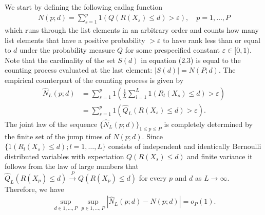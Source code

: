 \documentclass[oupdraft]{bio}
\newcommand{\nn}{\nonumber}
\begin{document}
We start by defining the following cadlag function
\begin{align}
  N(p; d) = \sum_{s=1}^p 1\left(Q(R(X_s) \leq d) > \varepsilon\right), \quad p = 1,\ldots, P
\end{align}
which runs through the list elements in an arbitrary order and counts
how many list elements that have a positive probability $>\varepsilon$ to have
rank less than or equal to $d$ under the probability measure $Q$ for some prespecified constant $\varepsilon\in[0, 1)$.
Note that the cardinality of the set $S(d)$ in equation
(2.3) is equal to the counting process evaluated at the last element: $|S(d)| = N(P;d)$.
The empirical counterpart of the counting process is given by
\begin{align}
  \widehat{N}_L(p; d) &= \sum_{s=1}^p 1\left( \frac{1}{L} \sum_{l=1}^L 1(R_l(X_s) \leq d) > \varepsilon\right)\\
        &= \sum_{s=1}^p 1\left(\widehat{Q}_L(R(X_s) \leq d) > \varepsilon\right)\nn.
\end{align}
The joint law of the sequence
$\{\widehat{N}_L(p;d)\}_{1\leq p \leq P}$ is completely determined by
the finite set of the jump times of $N(p;d)$. Since
$\{1(R_l(X_s) \leq d); l=1,\dots, L\}$ consists of independent and
identically Bernoulli distributed variables with expectation
$Q(R(X_s) \leq d)$ and finite variance it follows from the law of large numbers that
$\widehat{Q}_L(R(X_p) \leq d) \overset{P}{\longrightarrow} Q(R(X_p)
\leq d)$ for every $p$ and $d$ as $L \rightarrow \infty$. 
Therefore, we have
\begin{align}
  \sup_{d \in 1,\ldots,P}\sup_{p \in 1,\ldots, P} \left|\widehat{N}_L(p; d) - N(p; d)\right| = o_P(1).\label{eq:countingConv}
\end{align}
\end{document}
